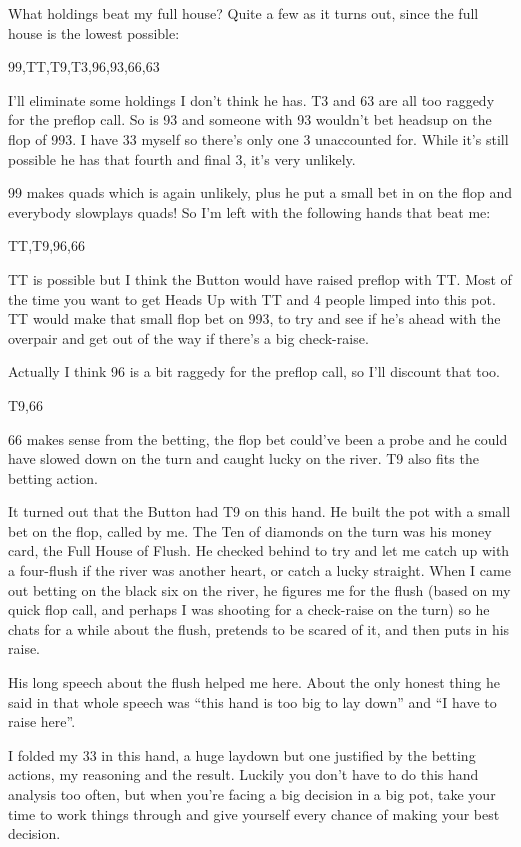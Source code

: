 What holdings beat my full house? Quite a few as it turns out, since
the full house is the lowest possible:

99,TT,T9,T3,96,93,66,63

I'll eliminate some holdings I don't think he has. T3 and 63 are
all too raggedy for the preflop call. So is 93 and someone with 93
wouldn't bet headsup on the flop of 993. I have 33 myself so there's
only one 3 unaccounted for. While it's still possible he has that
fourth and final 3, it's very unlikely.

99 makes quads which is again unlikely, plus he put a small bet in
on the flop and everybody slowplays quads! So I'm left with the following
hands that beat me:

TT,T9,96,66

TT is possible but I think the Button would have raised preflop with TT.
Most of the time you want to get Heads Up with TT and 4 people limped
into this pot. TT would make that small flop bet on 993, to try and see
if he's ahead with the overpair and get out of the way if there's a big
check-raise.

Actually I think 96 is a bit raggedy for the preflop call, so I'll
discount that too.

T9,66

66 makes sense from the betting, the flop bet could've been a probe
and he could have slowed down on the turn and caught lucky on the river.
T9 also fits the betting action.

It turned out that the Button had T9 on this hand.
He built the pot with a small bet on the flop, called by me.
The Ten of diamonds on the turn was his money card, the
Full House of Flush. He checked behind
to try and let me catch up with a four-flush if the river was
another heart, or catch a lucky straight.
When I came out betting on the black six on
the river, he figures me for the flush (based on my quick
flop call, and perhaps I was shooting for a check-raise on the turn)
so he chats for a while about the flush, pretends to be scared of it,
and then puts in his raise.

His long speech about the flush helped me here. About
the only honest thing he said in that whole speech was
``this hand is too big to lay down'' and ``I have to raise here''.

I folded my 33 in this hand, a huge laydown but one
justified by the betting actions, my reasoning and the result.
Luckily you don't have to do this hand analysis too often, but
when you're facing a big decision in a big pot, take your time to
work things through and give yourself every chance of making your best
decision.


